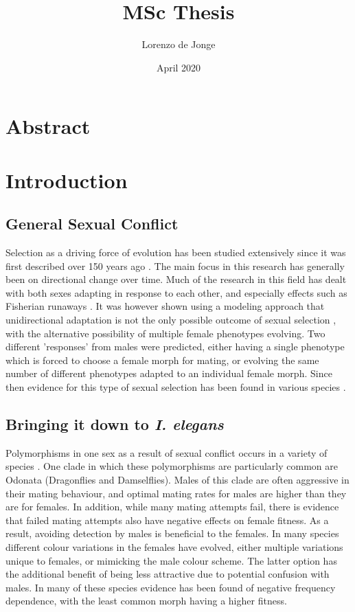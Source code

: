 \documentclass{article}
\title{MSc Thesis}
\author{Lorenzo de Jonge}
\date{April 2020}
\begin{document}
\maketitle

\section{Abstract}

\section{Introduction}

\subsection{General Sexual Conflict}
Selection as a driving force of evolution has been studied extensively since it was first described over 150 years ago \cite{Darwin1858, Darwin1859}. The main focus in this research has generally been on directional change over time. Much of the research in this field has dealt with both sexes adapting in response to each other, and especially effects such as Fisherian runaways \cite{Fisher1915}. It was however shown using a modeling approach that unidirectional adaptation is not the only possible outcome of sexual selection \cite{Gavrilets2002}, with the alternative possibility of multiple female phenotypes evolving. Two different 'responses' from males were predicted, either having a single phenotype which is forced to choose a female morph for mating, or evolving the same number of different phenotypes adapted to an individual female morph. Since then evidence for this type of sexual selection has been found in various species \cite{Hardling2006,Kagawa2016,Svensson2007}.

\cite{Chapman2003}


\subsection{Bringing it down to \textit{I. elegans}}
Polymorphisms in one sex as a result of sexual conflict occurs in a variety of species \cite{Needed}. One clade in which these polymorphisms are particularly common are Odonata (Dragonflies and Damselflies). Males of this clade are often aggressive in their mating behaviour, and optimal mating rates for males are higher than they are for females. In addition, while many mating attempts fail, there is evidence that failed mating attempts also have negative effects on female fitness. As a result, avoiding detection by males is beneficial to the females. In many species different colour variations in the females have evolved, either multiple variations unique to females, or mimicking the male colour scheme. The latter option has the additional benefit of being less attractive due to potential confusion with males. In many of these species evidence has been found of negative frequency dependence, with the least common morph having a higher fitness.
\end{document}
